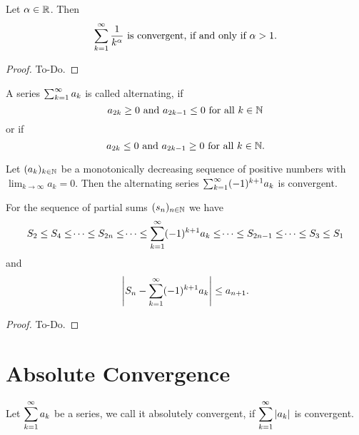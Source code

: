 \begin{theorem}\label{thm:suminvseqconv}
    Let $\alpha \in \R$.
    Then
    \[
    \infsum\frac{1}{k ^ \alpha}\text{ is convergent, if and only if $\alpha > 1$}.
    \]
\end{theorem}
\begin{proof}
    To-Do.
\end{proof}

\begin{definition}\label{def:alternating_series}
    A series $\infsum a_k$ is called alternating,
    if
    \[
    a_{2k} \geq 0\text{ and } a_{2k - 1} \leq 0\text{ for all $k \in \N$}
    \]
    or if 
    \[
    a_{2k} \leq 0\text{ and } a_{2k - 1} \geq 0\text{ for all $k \in \N$}.
    \]
\end{definition}

\begin{theorem}\label{thm:sum_alternating_sign_test}
    Let $\dseq[k]{a}$ be a monotonically decreasing sequence of positive numbers with $\lim_{k \to \infty}a_k = 0$.
    Then the alternating series $\infsum(-1) ^ {k + 1}a_k$ is convergent.

    For the sequence of partial sums $\dseq{s}$ we have
    \[
    S_2 \leq S_4 \leq \dotsi \leq S_{2n} \leq \dotsi \leq \infsum(-1) ^ {k + 1}a_k \leq \dotsi \leq S_{2n - 1} \leq \dotsi \leq S_3 \leq S_1
    \]
    and
    \[
    \left|S_n - \infsum(-1) ^ {k + 1}a_k\right| \leq a_{n + 1}.
    \]
\end{theorem}
\begin{proof}
    To-Do.
\end{proof}

\section{Absolute Convergence}

\begin{definition}\label{def:sum_abs_convergence}
    Let $\displaystyle\infsum[k = 1]a_k$ be a series,
    we call it absolutely convergent,
    if $\displaystyle\infsum[k = 1]|a_k|$ is convergent.
\end{definition}

